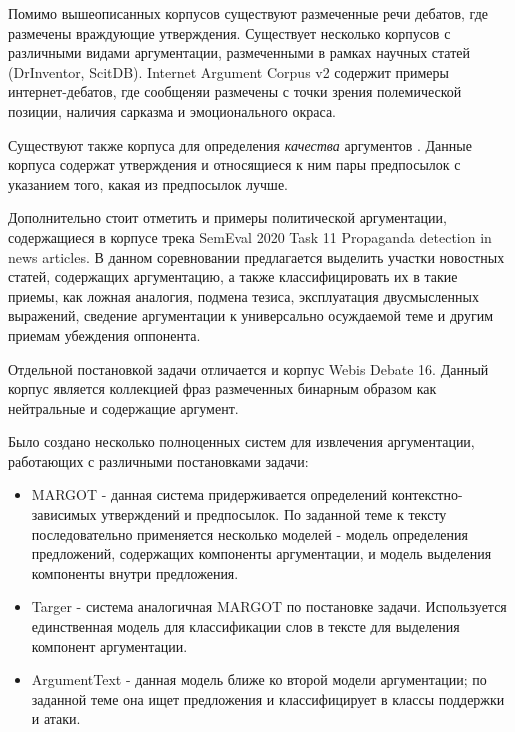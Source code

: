 Помимо вышеописанных корпусов существуют размеченные речи дебатов, где размечены враждующие утверждения. Существует несколько корпусов с различными видами аргументации, размеченными в рамках научных статей (DrInventor, ScitDB). Internet Argument Corpus v2 содержит примеры интернет-дебатов, где сообщеняи размечены с точки зрения полемической позиции, наличия сарказма и эмоционального окраса.

Существуют также корпуса для определения \textit{качества} аргументов \cite{toledo2019automatic, gretz2020large}. Данные корпуса содержат утверждения и относящиеся к ним пары предпосылок с указанием того, какая из предпосылок лучше.

Дополнительно стоит отметить и примеры политической аргументации, содержащиеся в корпусе трека SemEval 2020 Task 11 Propaganda detection in news articles. В данном соревновании предлагается выделить участки новостных статей, содержащих аргументацию, а также классифицировать их в такие приемы, как ложная аналогия, подмена тезиса, эксплуатация двусмысленных выражений, сведение аргументации к универсально осуждаемой теме и другим приемам убеждения оппонента.

Отдельной постановкой задачи отличается и корпус Webis Debate 16\cite{webis16}. Данный корпус является коллекцией фраз размеченных бинарным образом как нейтральные и содержащие аргумент.

Было создано несколько полноценных систем для извлечения аргументации, работающих с различными постановками задачи:
\begin{itemize}
    \item MARGOT - данная система придерживается определений контекстно-зависимых утверждений и предпосылок. По заданной теме к тексту последовательно применяется несколько моделей - модель определения предложений, содержащих компоненты аргументации, и модель выделения компоненты внутри предложения.
    \item Targer - система аналогичная MARGOT по постановке задачи. Используется единственная модель для классификации слов в тексте для выделения компонент аргументации.
    \item ArgumentText - данная модель ближе ко второй модели аргументации; по заданной теме она ищет предложения и классифицирует в классы поддержки и атаки.
\end{itemize}

